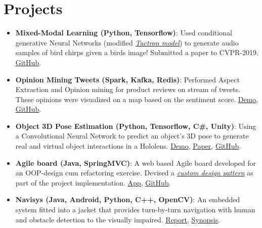 \documentclass[letterpaper,11pt]{article}
\newcommand{\resumeItem}[2]{
  \linespread{1.1}
	\item\small{
    	\textbf{#1}{: #2}
  	}
}
\newcommand{\resumeSubItem}[2]{\resumeItem{#1}{#2}\vspace{-4pt}}
\newcommand{\resumeSubHeadingListStart}{\begin{itemize}[leftmargin=*]}
\newcommand{\resumeSubHeadingListEnd}{\end{itemize}\vspace{-14pt}}
\begin{document}
\section{Projects}
  \resumeSubHeadingListStart
  \resumeSubItem{Mixed-Modal Learning (Python, Tensorflow)}
      {Used conditional generative Neural Networks (modified \href{https://arxiv.org/abs/1703.10135}{\textit{Tactron model}}) to generate audio samples of bird chirps given a birds image! Submitted a paper to CVPR-2019. \hfill \textbf{\faLink} \href{https://github.com/nikhilsu/Mixed-modal-learning}{\underline{GitHub}}.}
  \resumeSubItem{Opinion Mining Tweets (Spark, Kafka, Redis)}
      {Performed Aspect Extraction and Opinion mining for product reviews on stream of tweets. These opinions were visualized on a map based on the sentiment score. \hfill \textbf{\faLink}
      \href{https://drive.google.com/file/d/1zUeC4FPc74mw2Z6SB1qXauo8p6Ex2Cc9/view?usp=sharing}{\underline{Demo}},  \href{https://github.com/nikhilsu/Aspect-Extraction-and-Opinion-Mining}{\underline{GitHub}}.}
    \resumeSubItem{Object 3D Pose Estimation (Python, Tensorflow, C\#, Unity)}
      {Using a Convolutional Neural Network to predict an object\rq s 3D pose to generate real and virtual object interactions in a Hololens. \hfill \textbf{\faLink}
      \href{https://drive.google.com/file/d/1kCepKQxR73tUTLuvmd1YL3sIbj1GxDdc/view?usp=sharing}{\underline{Demo}}, \href{https://drive.google.com/file/d/1mRwSJ8p2-g-gtBGl1A8seRB8SojWQphm/view?usp=sharing}{\underline{Paper}}, \href{https://github.com/nikhilsu/Object-location-detection}{\underline{GitHub}}.}
    \resumeSubItem{Agile board (Java, SpringMVC)}
      {A web based Agile board developed for an OOP-design cum refactoring exercise. Devised a \href{https://github.com/nikhilsu/Agile-board/blob/master/src/main/java/com/prorg/helper/result/Response.java}{\emph{custom design pattern}} as part of the project implementation. \hfill \textbf{\faLink}
      \href{https://prorg.herokuapp.com}{\underline{App}}, \href{https://github.com/nikhilsu/Agile-board}{\underline{GitHub}}.}
    \resumeSubItem{Navisys (Java, Android, Python, C++, OpenCV)}
      {An embedded system fitted into a jacket that provides turn-by-turn navigation with human and obstacle detection to the visually impaired. \hfill \textbf{\faLink}
      \href{https://drive.google.com/file/d/1bFHeZ7-7uwZ0spir3YQ7r0maWdLteEtu/view?usp=sharing}{\underline{Report}},
      \href{https://drive.google.com/file/d/1JWB67U2jjTG7cXZFVjRPVGKsv-rRhgUQ/view?usp=sharing}{\underline{Synopsis}}.}
  \resumeSubHeadingListEnd
\vspace{3pt}
\end{document}
